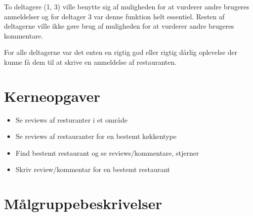 \documentclass[a4paper, 12pt]{article}
\begin{document}
To deltagere (1, 3) ville benytte sig af muligheden for at vurderer
andre brugeres anmeldelser og for deltager 3 var denne funktion helt
essentiel. Resten af deltagerne ville ikke gøre brug af muligheden for
at vurderer andre brugeres kommentare.


For alle deltagerne var det enten en rigtig god eller rigtig dårlig
oplevelse der kunne få dem til at skrive en anmeldelse af
restauranten.



\section{Kerneopgaver}
\label{sec:Kerneopgaver}
\begin{itemize}
\item Se reviews af resturanter i et område
\item Se reviews af restauranter for en bestemt køkkentype
\item Find bestemt restaurant og se reviews/kommentare, stjerner
\item Skriv review/kommentar for en bestemt restaurant
\end{itemize}

\section{Målgruppebeskrivelser}
\label{sec:Maalgruppebeskrivelser}
\end{document}
